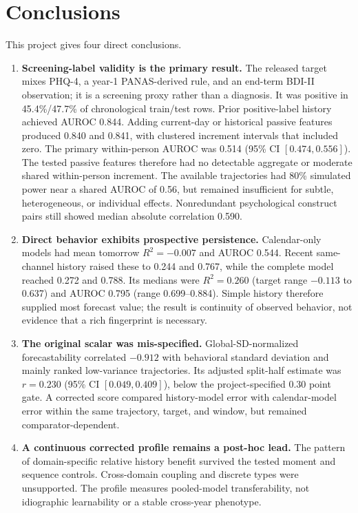 \documentclass[a4paper,11pt,oneside]{report}
\begin{document}
\section{Conclusions}

This project gives four direct conclusions.

\begin{enumerate}
  \item \textbf{Screening-label validity is the primary result.} The released target
  mixes PHQ-4, a year-1 PANAS-derived rule, and an end-term BDI-II observation; it is
  a screening proxy rather than a diagnosis. It was positive in 45.4\%/47.7\% of
  chronological train/test rows. Prior positive-label history achieved AUROC 0.844. Adding
  current-day or historical passive features produced 0.840 and 0.841, with
  clustered increment intervals that included zero. The primary within-person AUROC
  was 0.514 (95\% CI $[0.474,0.556]$). The tested passive features therefore had no
  detectable aggregate or moderate shared within-person increment. The available
  trajectories had 80\% simulated power near a shared AUROC of 0.56, but remained
  insufficient for subtle, heterogeneous, or individual effects. Nonredundant
  psychological construct pairs still showed median absolute correlation 0.590.

  \item \textbf{Direct behavior exhibits prospective persistence.} Calendar-only
  models had mean tomorrow $R^2=-0.007$ and AUROC 0.544. Recent same-channel history
  raised these to 0.244 and 0.767, while the complete model reached 0.272 and 0.788.
  Its medians were $R^2=0.260$ (target range $-0.113$ to 0.637) and AUROC 0.795
  (range 0.699--0.884). Simple history therefore supplied most forecast value; the
  result is continuity of observed behavior, not evidence that a rich fingerprint
  is necessary.

  \item \textbf{The original scalar was mis-specified.} Global-SD-normalized
  forecastability correlated $-0.912$ with behavioral standard deviation and mainly
  ranked low-variance trajectories. Its adjusted split-half estimate was $r=0.230$
  (95\% CI $[0.049,0.409]$), below the project-specified 0.30 point gate. A corrected
  score compared history-model error with calendar-model error within the same
  trajectory, target, and window, but remained comparator-dependent.

  \item \textbf{A continuous corrected profile remains a post-hoc lead.} The pattern
  of domain-specific relative history benefit survived the tested moment and
  sequence controls. Cross-domain coupling and discrete types were unsupported. The
  profile measures pooled-model transferability, not idiographic learnability or a
  stable cross-year phenotype.
\end{enumerate}
\end{document}
